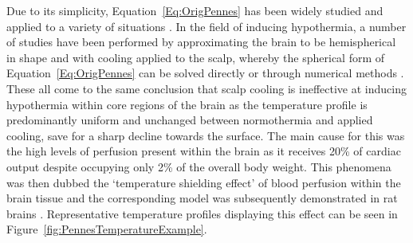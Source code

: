 \documentclass[11pt,english,a4paper,twoside,openright]{report}
\begin{document}
{{{{{{{{	Due to its simplicity, Equation~\ref{Eq:OrigPennes} has been widely studied and applied to a variety of situations \cite{wissler1998pennes}. In the field of inducing hypothermia, a number of studies have been performed by approximating the brain to be hemispherical in shape and with cooling applied to the scalp, whereby the spherical form of Equation~\ref{Eq:OrigPennes} can be solved directly or through numerical methods \cite{nelson1998brain}\cite{xu1999mathematical}\cite{zhu2001theoretical}\cite{sukstanskii2004analytical}\cite{sukstanskii2007theoretical}. These all come to the same conclusion that scalp cooling is ineffective at inducing hypothermia within core regions of the brain as the temperature profile is predominantly uniform and unchanged between normothermia and applied cooling, save for a sharp decline towards the surface. The main cause for this was the high levels of perfusion present within the brain as it receives 20\% of cardiac output despite occupying only 2\% of the overall body weight. This phenomena was then dubbed the `temperature shielding effect' of blood perfusion within the brain tissue and the corresponding model was subsequently demonstrated in rat brains \cite{zhu2006body}\cite{zhu2009body}. Representative temperature profiles displaying this effect can be seen in Figure~\ref{fig:PennesTemperatureExample}.
	
}}}}}}}}
\end{document}
